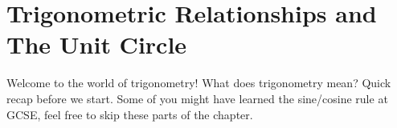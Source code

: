 \chapter{Trigonometric Relationships and The Unit Circle}
Welcome to the world of trigonometry!
What does trigonometry mean?
Quick recap before we start. Some of you might have learned the sine/cosine rule at GCSE, feel free to skip these parts of the chapter.